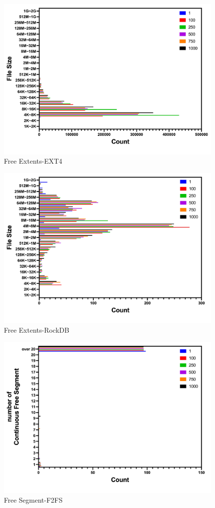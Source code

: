 \begin{figure}[t]
    \centering
	\includegraphics[width=0.95\columnwidth]{graphs/free_extents_ext4}
	\caption{Free Extents-EXT4}
	\label{f:free_extents_ext4}
\end{figure}

\begin{figure}[t]
    \centering
	\includegraphics[width=0.95\columnwidth]{graphs/free_extents_rocksdb}
	\caption{Free Extents-RockDB}
	\label{f:free_extents_rocksdb}
\end{figure}

\begin{figure}[t]
    \centering
	\includegraphics[width=0.95\columnwidth]{graphs/free_segment_f2fs}
	\caption{Free Segment-F2FS}
	\label{f:free_segment_f2fs}
\end{figure}

